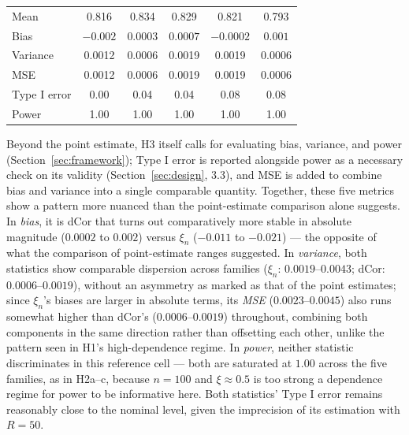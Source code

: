 \documentclass[article]{ajs}
\begin{document}
\begin{table}[H]
\begin{center}
{\begin{tabular}{lccccc}
Mean                & 0.816 & 0.834 & 0.829 & 0.821 & 0.793 \\
Bias                & $-0.002$ & $0.0003$ & $0.0007$ & $-0.0002$ & $0.001$ \\
Variance             & 0.0012 & 0.0006 & 0.0019 & 0.0019 & 0.0006 \\
MSE                  & 0.0012 & 0.0006 & 0.0019 & 0.0019 & 0.0006 \\
Type I error      & 0.00 & 0.04 & 0.04 & 0.08 & 0.08 \\
Power             & 1.00 & 1.00 & 1.00 & 1.00 & 1.00 \\
\bottomrule
\end{tabular}%
}
\end{center}
\end{table}

Beyond the point estimate, H3 itself calls for evaluating bias,
variance, and power (Section~\ref{sec:framework}); Type I error is
reported alongside power as a necessary check on its validity
(Section~\ref{sec:design}, 3.3), and MSE is added to combine bias and
variance into a single comparable quantity. Together, these five
metrics show a pattern more nuanced than the point-estimate comparison
alone suggests. In
\emph{bias}, it is dCor that turns out comparatively more stable in
absolute magnitude ($0.0002$ to $0.002$) versus $\xi_n$
($-0.011$ to $-0.021$) --- the opposite of what the comparison of
point-estimate ranges suggested. In \emph{variance}, both statistics
show comparable dispersion across families ($\xi_n$:
$0.0019$--$0.0043$; dCor: $0.0006$--$0.0019$), without an asymmetry as
marked as that of the point estimates; since $\xi_n$'s biases are
larger in absolute terms, its \emph{MSE} ($0.0023$--$0.0045$) also runs
somewhat higher than dCor's ($0.0006$--$0.0019$) throughout, combining
both components in the same direction rather than offsetting each
other, unlike the pattern seen in H1's high-dependence regime. In
\emph{power}, neither
statistic discriminates in this reference cell --- both are saturated
at $1.00$ across the five families, as in H2a--c, because $n=100$ and
$\xi\approx 0.5$ is too strong a dependence regime for power to be
informative here. Both statistics' Type I error remains reasonably
close to the nominal level, given the imprecision of its estimation
with $R=50$.
\end{document}
